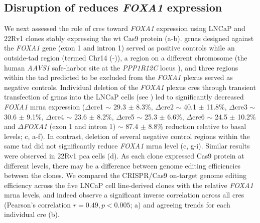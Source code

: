 \subsection{Disruption of  reduces \emph{FOXA1}  expression}

We next assessed the role of \glspl{cre} toward \emph{FOXA1} expression using LNCaP and 22Rv1 clones stably expressing the \gls{wt} Cas9 protein (a-b).
\Glspl{grna} designed against the \emph{FOXA1} gene (exon 1 and intron 1) served as positive controls while an outside-\gls{tad} region (termed Chr14 (-)), a region on a different chromosome (the human \emph{AAVS1} safe-harbor site at the \emph{PPP1R12C} locus \cite{kronTMPRSS2ERGFusion2017,dekelverFunctionalGenomicsProteomics2010}), and three regions within the \gls{tad} predicted to be excluded from the \emph{FOXA1} plexus served as negative controls.
Individual deletion of the \emph{FOXA1} plexus \glspl{cre} through transient transfection of \glspl{grna} into the LNCaP cells (see ) led to significantly decreased \emph{FOXA1} \gls{mrna} expression ($\Delta$\gls{cre}1 $\sim$ 29.3 $\pm$ 8.3\%, $\Delta$\gls{cre}2 $\sim$ 40.1 $\pm$ 11.8\%, $\Delta$\gls{cre}3 $\sim$ 30.6 $\pm$ 9.1\%, $\Delta$\gls{cre}4 $\sim$ 23.6 $\pm$ 8.2\%, $\Delta$\gls{cre}5 $\sim$ 25.3 $\pm$ 6.6\%, $\Delta$\gls{cre}6 $\sim$ 24.5 $\pm$ 10.2\% and $\Delta$\emph{FOXA1} (exon 1 and intron 1) $\sim$ 87.4 $\pm$ 8.8\% reduction relative to basal levels; c, a-f).
In contrast, deletion of several negative control regions within the same \gls{tad} did not significantly reduce \emph{FOXA1} \gls{mrna} level (c, g-i).
Similar results were observed in 22Rv1 \gls{pca} cells (d).
As each clone expressed Cas9 protein at different levels, there may be a difference between genome editing efficiencies between the clones.
We compared the CRISPR/Cas9 on-target genome editing efficiency across the five LNCaP cell line-derived clones with the relative \emph{FOXA1} \gls{mrna} levels, and indeed observe a significant inverse correlation across all \glspl{cre} (Pearson's correlation $r = 0.49, p < 0.005$; a) and agreeing trends for each individual \gls{cre} (b).

